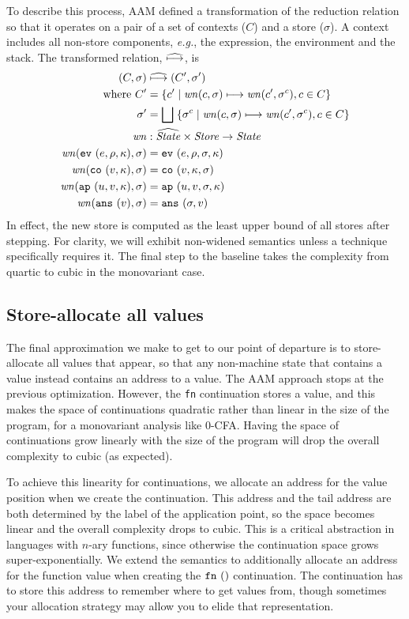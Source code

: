 \documentclass[preprint,onecolumn,9pt]{sigplanconf} %
\begin{document}
To describe this process, AAM defined a transformation of the reduction relation so that it operates on
a pair of a set of contexts ($C$) and a store ($\sigma$).
%
A context includes all non-store components, \emph{e.g.}, the expression, the environment and the stack.
%
The transformed relation, $\widehat{\mathbin{\longmapsto}}$, is
%
\begin{align*}
(C, \sigma) &\mathrel{\widehat{\mathbin{\longmapsto}}} (C', \sigma') \\
\mbox{where } C' &= \{c' \mid \mathit{wn}(c, \sigma) \mathrel{\mathbin{\longmapsto}} \mathit{wn}(c', \sigma^c), c \in C\} \\
              \sigma' &= \bigsqcup\; \{\sigma^c \mid \mathit{wn}(c,\sigma)\mathrel{\mathbin{\longmapsto}} \mathit{wn}(c', \sigma^c), c \in C\} \\
\mathit{wn} &: \widehat{\mathit{State}} \times \mathit{Store} \to \mathit{State} \\
\mathit{wn}({\tt ev{\ }}({e, \rho, \kappa}), \sigma) &= {\tt ev{\ }}({e, \rho, \sigma, \kappa}) \\
\mathit{wn}({\tt co{\ }}({v, \kappa}), \sigma) &= {\tt co{\ }}({v, \kappa, \sigma}) \\
\mathit{wn}({\tt ap{\ }}({u, v, \kappa}), \sigma) &= {\tt ap{\ }}({u, v, \sigma, \kappa}) \\
\mathit{wn}({\tt ans{\ }}({v}), \sigma) &= {\tt ans{\ }}({\sigma, v})
\end{align*}
%
In effect, the new store is computed as the least upper bound of all
stores after stepping. For clarity, we will exhibit non-widened
semantics unless a technique specifically requires it. The final step
to the baseline takes the complexity from quartic to cubic in the
monovariant case.

\subsection{Store-allocate all values}
\label{sec:baselineeval}

The final approximation we make to get to our point of departure is to
store-allocate all values that appear, so that any non-machine state
that contains a value instead contains an address to a value.  The AAM
approach stops at the previous optimization.  However, the {\tt fn}
continuation stores a value, and this makes the space of continuations
quadratic rather than linear in the size of the program, for a
monovariant analysis like 0-CFA.  Having the space of continuations
grow linearly with the size of the program will drop the overall
complexity to cubic (as expected).

To achieve this linearity for continuations, we allocate an address
for the value position when we create the continuation.  This address
and the tail address are both determined by the label of the
application point, so the space becomes linear and the overall
complexity drops to cubic.  This is a critical abstraction in
languages with $n$-ary functions, since otherwise the continuation
space grows super-exponentially. We extend the semantics to
additionally allocate an address for the function value when creating
the ${\tt fn{\ }}({})$ continuation. The continuation has to store this address
to remember where to get values from, though sometimes your allocation
strategy may allow you to elide that representation.
\end{document}
